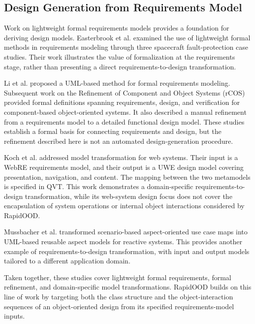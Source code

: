 \documentclass[pdflatex,sn-mathphys-num]{sn-jnl}%
\theoremstyle{thmstyleone}%
\theoremstyle{thmstyletwo}%
\theoremstyle{thmstylethree}%
\begin{document}
\subsection{Design Generation from Requirements Model}
{\color{red}
Work on lightweight formal requirements models provides a foundation for deriving design models. Easterbrook et al.\cite{Steve98} examined the use of lightweight formal methods in requirements modeling through three spacecraft fault-protection case studies. Their work illustrates the value of formalization at the requirements stage, rather than presenting a direct requirements-to-design transformation.

Li et al.\cite{Li01} proposed a UML-based method for formal requirements modeling. Subsequent work on the Refinement of Component and Object Systems (rCOS)\cite{Liu2008,Liu2009,Liu2010} provided formal definitions spanning requirements, design, and verification for component-based object-oriented systems. It also described a manual refinement from a requirements model to a detailed functional design model. These studies establish a formal basis for connecting requirements and design, but the refinement described here is not an automated design-generation procedure.

Koch et al.\cite{KochZE06} addressed model transformation for web systems. Their input is a WebRE requirements model, and their output is a UWE design model covering presentation, navigation, and content. The mapping between the two metamodels is specified in QVT. This work demonstrates a domain-specific requirements-to-design transformation, while its web-system design focus does not cover the encapsulation of system operations or internal object interactions considered by RapidOOD.

Mussbacher et al.\cite{MussbacherKA11} transformed scenario-based aspect-oriented use case maps into UML-based reusable aspect models for reactive systems. This provides another example of requirements-to-design transformation, with input and output models tailored to a different application domain.

Taken together, these studies cover lightweight formal requirements, formal refinement, and domain-specific model transformations. RapidOOD builds on this line of work by targeting both the class structure and the object-interaction sequences of an object-oriented design from its specified requirements-model inputs.
}
\end{document}
